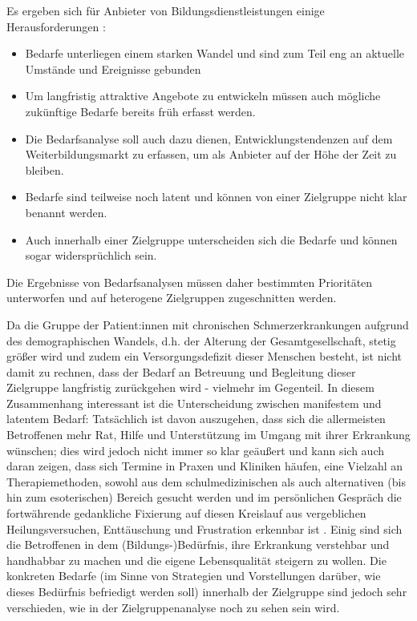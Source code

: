 \documentclass[
  twoside,
  parskip=half-,
]{scrreprt}
\begin{document}
Es ergeben sich für Anbieter von Bildungsdienstleistungen einige Herausforderungen \autocite[5]{kos}:
\begin{itemize}
  \item Bedarfe unterliegen einem starken Wandel und sind zum Teil eng an aktuelle Umstände und Ereignisse gebunden
  \item Um langfristig attraktive Angebote zu entwickeln müssen auch mögliche zukünftige Bedarfe bereits früh erfasst werden.
  \item Die Bedarfsanalyse soll auch dazu dienen, Entwicklungstendenzen auf dem Weiterbildungsmarkt zu erfassen, um als Anbieter auf der Höhe der Zeit zu bleiben.
  \item Bedarfe sind teilweise noch latent und können von einer Zielgruppe nicht klar benannt werden.
  \item Auch innerhalb einer Zielgruppe unterscheiden sich die Bedarfe und können sogar widersprüchlich sein.
\end{itemize} 

Die Ergebnisse von Bedarfsanalysen müssen daher bestimmten Prioritäten unterworfen und auf heterogene Zielgruppen zugeschnitten werden.  

\begin{praxis}
  Da die Gruppe der Patient:innen mit chronischen Schmerzerkrankungen aufgrund des demographischen Wandels, d.h. der Alterung der Gesamtgesellschaft, stetig größer wird und zudem ein Versorgungsdefizit dieser Menschen besteht, ist nicht damit zu rechnen, dass der Bedarf an Betreuung und Begleitung dieser Zielgruppe langfristig zurückgehen wird - vielmehr im Gegenteil. 
  In diesem Zusammenhang interessant ist die Unterscheidung zwischen manifestem und latentem Bedarf: Tatsächlich ist davon auszugehen, dass sich die allermeisten Betroffenen mehr Rat, Hilfe und Unterstützung im Umgang mit ihrer Erkrankung wünschen; dies wird jedoch nicht immer so klar geäußert und kann sich auch daran zeigen, dass sich Termine in Praxen und Kliniken häufen, eine Vielzahl an Therapiemethoden, sowohl aus dem schulmedizinischen als auch alternativen (bis hin zum esoterischen) Bereich gesucht werden und im persönlichen Gespräch die fortwährende gedankliche Fixierung auf diesen Kreislauf aus vergeblichen Heilungsversuchen, Enttäuschung und Frustration erkennbar ist \autocite[vgl.][10ff.]{richter}. Einig sind sich die Betroffenen in dem (Bildungs-)Bedürfnis, ihre Erkrankung verstehbar und handhabbar zu machen und die eigene Lebensqualität steigern zu wollen. Die konkreten Bedarfe (im Sinne von Strategien und Vorstellungen darüber, wie dieses Bedürfnis befriedigt werden soll) innerhalb der Zielgruppe sind jedoch sehr verschieden, wie in der Zielgruppenanalyse noch zu sehen sein wird. 
\end{praxis}
\end{document}

